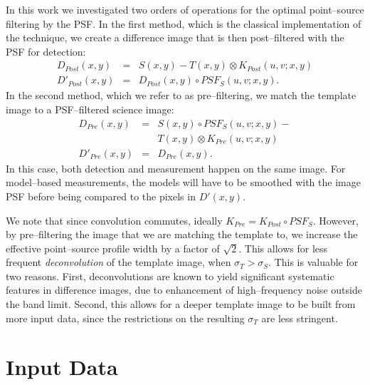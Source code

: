 \documentclass[iop]{emulateapj}
\begin{document}
In this work we investigated two orders of operations for the optimal point--source filtering by the PSF.
In the first method, which is the classical implementation of the technique, we create a difference image that is then post--filtered with the PSF for detection:
\begin{eqnarray}
D_{Post}(x,y) & = & S(x,y) - T(x,y) \otimes K_{Post}(u,v;x,y)  \nonumber \\
D'_{Post}(x,y) & = & D_{Post}(x,y) \circ PSF_S(u,v;x,y).  \nonumber
\end{eqnarray}
In the second method, which we refer to as pre--filtering, we match the template image to a PSF--filtered science image:
\begin{eqnarray}
D_{Pre}(x,y)  & = & S(x,y) \circ PSF_S(u,v;x,y) - \nonumber \\
             &   & T(x,y) \otimes K_{Pre}(u,v;x,y) \nonumber \\
D'_{Pre}(x,y) & = & D_{Pre}(x,y). \nonumber
\end{eqnarray}
In this case, both detection and measurement happen on the same image.
For model--based measurements, the models will have to be smoothed with the image PSF before being compared to the pixels in $D'(x,y)$.

We note that since convolution commutes, ideally $K_{Pre} = K_{Post} \circ PSF_S$.
However, by pre--filtering the image that we are matching the template to, we increase the effective point--source profile width by a factor of $\sqrt{2}$.
This allows for less frequent {\it deconvolution} of the template image, when $\sigma_T > \sigma_S$.
This is valuable for two reasons.
First, deconvolutions are known to yield significant systematic features in difference images, due to enhancement of high--frequency noise outside the band limit.
Second, this allows for a deeper template image to be built from more input data, since the restrictions on the resulting $\sigma_T$ are less stringent.


\section{Input Data}
\end{document}
